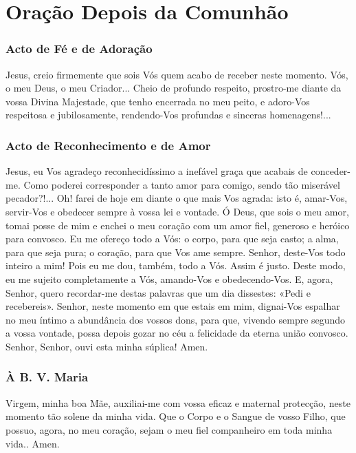 \section{Oração Depois da Comunhão}\label{oracaodepoiscomunhao}

\subsubsection{Acto de Fé e de Adoração}

 Jesus, creio firmemente que sois Vós quem acabo de receber neste momento. Vós, o meu Deus, o meu Criador... Cheio de profundo respeito, prostro-me diante da vossa Divina Majestade, que tenho encerrada no meu peito, e adoro-Vos respeitosa e jubilosamente, rendendo-Vos profundas e sinceras homenagens!...

\subsubsection{Acto de Reconhecimento e de Amor}

 Jesus, eu Vos agradeço reconhecidíssimo a inefável graça que acabais de conceder-me. Como poderei corresponder a tanto amor para comigo, sendo tão miserável pecador?!... Oh! farei de hoje em diante o que mais Vos agrada: isto é, amar-Vos, servir-Vos e obedecer sempre à vossa lei e vontade. Ó Deus, que sois o meu amor, tomai posse de mim e enchei o meu coração com um amor fiel, generoso e heróico para convosco. Eu me ofereço todo a Vós: o corpo, para que seja casto; a alma, para que seja pura; o coração, para que Vos ame sempre. Senhor, deste-Vos todo inteiro a mim! Pois eu me dou, também, todo a Vós. Assim é justo. Deste modo, eu me sujeito completamente a Vós, amando-Vos e obedecendo-Vos. E, agora, Senhor, quero recordar-me destas palavras que um dia dissestes: «Pedi e recebereis». Senhor, neste momento em que estais em mim, dignai-Vos espalhar no meu íntimo a abundância dos vossos dons, para que, vivendo sempre segundo a vossa vontade, possa depois gozar no céu a felicidade da eterna união convosco. Senhor, Senhor, ouvi esta minha súplica! Amen.

\subsubsection{À B. V. Maria}

 Virgem, minha boa Mãe, auxiliai-me com vossa eficaz e maternal protecção, neste momento tão solene da minha vida. Que o Corpo e o Sangue de vosso Filho, que possuo, agora, no meu coração, sejam o meu fiel companheiro em toda minha vida.. Amen.
